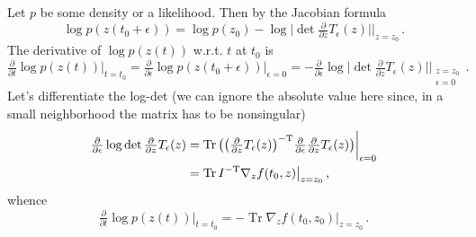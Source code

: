 \documentclass[a4paper]{article}
\newcommand{\T}{\mathrm{T}}
\DeclareMathOperator{\Tr}{Tr}
\begin{document}
Let $p$ be some density or a likelihood. Then by the Jacobian formula
\begin{equation}
  \log p(z(t_0 + \epsilon))
    = \log p(z_0)
    - \log \bigl \lvert
        \det \tfrac{\partial}{\partial z} T_\epsilon (z)
      \bigr \rvert \Big \vert_{z=z_0}
  \,.
\end{equation}
The derivative of $\log p(z(t))$ w.r.t. $t$ at $t_0$ is
\begin{equation}
  \tfrac{\partial}{\partial t}
    \log p(z(t)) \bigg\vert_{t = t_0}
    = \tfrac{\partial}{\partial \epsilon}
      \log p(z(t_0 + \epsilon)) \bigg\vert_{\epsilon = 0}
    = - \tfrac{\partial}{\partial \epsilon} \log \bigl \lvert
        \det \tfrac{\partial}{\partial z} T_\epsilon (z)
      \bigr \rvert \bigg \vert_{\substack{
        z=z_0 \\ \epsilon = 0}}
      \,.
\end{equation}
Let's differentiate the log-det (we can ignore the absolute value here since,
in a small neighborhood the matrix has to be nonsingular)
\begin{align}
  \tfrac{\partial}{\partial \epsilon}
    \log \det \tfrac{\partial}{\partial z} T_\epsilon (z)
    &= \Tr{\bigl(
        \bigl( \tfrac{\partial}{\partial z} T_\epsilon (z) \bigr)^{- \T}
        \tfrac{\partial}{\partial \epsilon}
          \tfrac{\partial}{\partial z} T_\epsilon (z)
      \bigr)} \bigg\vert_{\epsilon = 0}
    \notag \\
    &= \Tr{ I^{- \T} \nabla_z f(t_0, z) \big \vert_{z=z_0}}
    \,,
\end{align}
whence
\begin{equation}
  \tfrac{\partial}{\partial t}
    \log p(z(t)) \bigg\vert_{t = t_0}
    = - \Tr{\nabla_z f(t_0, z_0) \big \vert_{z=z_0}}
      \,.
\end{equation}
\end{document}
